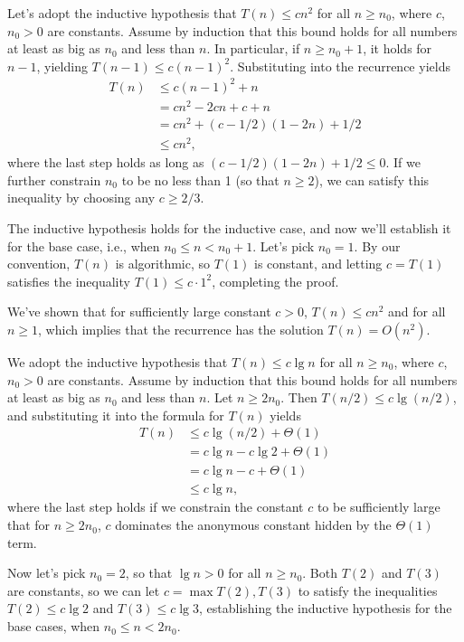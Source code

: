 \subexercise
Let's adopt the inductive hypothesis that $T(n)\le cn^2$ for all $n\ge n_0$, where $c$, $n_0>0$ are constants.
Assume by induction that this bound holds for all numbers at least as big as $n_0$ and less than $n$.
In particular, if $n\ge n_0+1$, it holds for $n-1$, yielding $T(n-1)\le c(n-1)^2$.
Substituting into the recurrence yields
\begin{align*}
    T(n) &\le c(n-1)^2+n \\
    &= cn^2-2cn+c+n \\
    &= cn^2+(c-1/2)(1-2n)+1/2 \\
    &\le cn^2,
\end{align*}
where the last step holds as long as $(c-1/2)(1-2n)+1/2\le0$.
If we further constrain $n_0$ to be no less than 1 (so that $n\ge2$), we can satisfy this inequality by choosing any $c\ge2/3$.

The inductive hypothesis holds for the inductive case, and now we'll establish it for the base case, i.e., when $n_0\le n<n_0+1$.
Let's pick $n_0=1$.
By our convention, $T(n)$ is algorithmic, so $T(1)$ is constant, and letting $c=T(1)$ satisfies the inequality $T(1)\le c\cdot1^2$, completing the proof.

We've shown that for sufficiently large constant $c>0$, $T(n)\le cn^2$ and for all $n\ge1$, which implies that the recurrence has the solution $T(n)=O(n^2)$.

\subexercise
We adopt the inductive hypothesis that $T(n)\le c\lg n$ for all $n\ge n_0$, where $c$, $n_0>0$ are constants.
Assume by induction that this bound holds for all numbers at least as big as $n_0$ and less than $n$.
Let $n\ge2n_0$.
Then $T(n/2)\le c\lg(n/2)$, and substituting it into the formula for $T(n)$ yields
\begin{align*}
    T(n) &\le c\lg(n/2)+\Theta(1) \\
    &= c\lg n-c\lg2+\Theta(1) \\
    &= c\lg n-c+\Theta(1) \\
    &\le c\lg n,
\end{align*}
where the last step holds if we constrain the constant $c$ to be sufficiently large that for $n\ge2n_0$, $c$ dominates the anonymous constant hidden by the $\Theta(1)$ term.

Now let's pick $n_0=2$, so that $\lg n>0$ for all $n\ge n_0$.
Both $T(2)$ and $T(3)$ are constants, so we can let $c=\max{T(2),T(3)}$ to satisfy the inequalities $T(2)\le c\lg2$ and $T(3)\le c\lg3$, establishing the inductive hypothesis for the base cases, when $n_0\le n<2n_0$.

